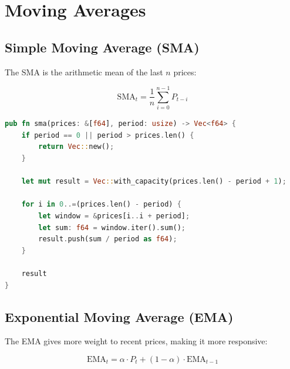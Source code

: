 
\section{Moving Averages}

\subsection{Simple Moving Average (SMA)}

The SMA is the arithmetic mean of the last $n$ prices:


\[
\text{SMA}_t = \frac{1}{n}\sum_{i=0}^{n-1} P_{t-i}
\]

\begin{lstlisting}[language=Rust]
pub fn sma(prices: &[f64], period: usize) -> Vec<f64> {
    if period == 0 || period > prices.len() {
        return Vec::new();
    }

    let mut result = Vec::with_capacity(prices.len() - period + 1);

    for i in 0..=(prices.len() - period) {
        let window = &prices[i..i + period];
        let sum: f64 = window.iter().sum();
        result.push(sum / period as f64);
    }

    result
}
\end{lstlisting}

\subsection{Exponential Moving Average (EMA)}

The EMA gives more weight to recent prices, making it more responsive:


\[
\text{EMA}_t = \alpha \cdot P_t + (1 - \alpha) \cdot \text{EMA}_{t-1}
\]

